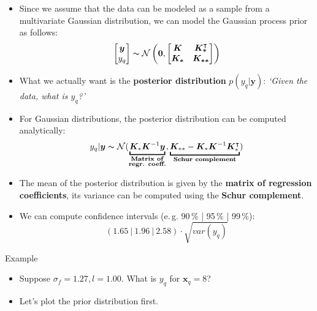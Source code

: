 \begin{frame}
	\begin{itemize}
		\item Since we assume that the data can be modeled as a sample from a multivariate Gaussian distribution, we can model the Gaussian process prior as follows:
		\begin{equation}
			\begin{bmatrix} \bm{y} \\ y_q \end{bmatrix} \thicksim
				\mathcal{N} \left(
					\bm{0}, 
					\begin{bmatrix} \bm{K} & \bm{K_*^{\intercal}} \\ \bm{K_*} & \bm{K_{**}} \end{bmatrix}
				\right)
		\end{equation}
		\item What we actually want is the \textbf{posterior distribution} $p(y_q \vert \bm{y})$: \textit{`Given the data, what is $y_q$?'}
		\item For Gaussian distributions, the posterior distribution can be computed analytically:
		\begin{equation}
			y_q \vert \bm{y} \thicksim \mathcal{N}(
				\underbracket{\bm{K}_* \bm{K}^{-1} \bm{y}}_{
					\substack{\text{\textbf{Matrix of}} \\ \text{\textbf{regr. coeff.}}}
				},
				\underbracket{\bm{K}_{**} - \bm{K}_* \bm{K}^{-1} \bm{K}_*^{\intercal}}_{
					\text{\textbf{Schur complement}}
				}
			)
		\end{equation}
		\item The mean of the posterior distribution is given by the \textbf{matrix of regression coefficients},
			its variance can be computed using the \textbf{Schur complement}.
		\item We can compute confidence intervals (e.\,g. 90\,\% | 95\,\% | 99\,\%):
		\begin{equation}
			(1.65\ |\ 1.96\ |\ 2.58) \cdot \sqrt{var(y_q)}
		\end{equation}
	\end{itemize}
\end{frame}


\begin{dwHeaderFrame}{Example}
	
	\begin{itemize}
		\item Suppose $\sigma_f = 1.27, l = 1.00$. What is $y_q$ for $\bm{x}_q = 8$?
		\item Let's plot the prior distribution first.
	\end{itemize}
\end{dwHeaderFrame}


